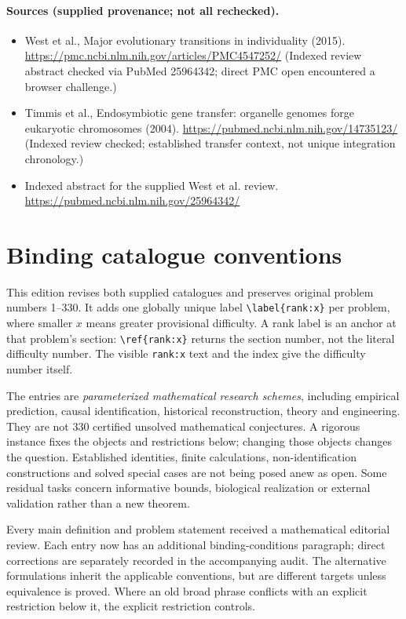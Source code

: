 \documentclass[11pt]{article}
\begin{document}
\paragraph{Sources (supplied provenance; not all rechecked).} \begin{itemize}
\item West et al., Major evolutionary transitions in individuality (2015). \url{https://pmc.ncbi.nlm.nih.gov/articles/PMC4547252/} (Indexed review abstract checked via PubMed 25964342; direct PMC open encountered a browser challenge.)
\item Timmis et al., Endosymbiotic gene transfer: organelle genomes forge eukaryotic chromosomes (2004). \url{https://pubmed.ncbi.nlm.nih.gov/14735123/} (Indexed review checked; established transfer context, not unique integration chronology.)
\item Indexed abstract for the supplied West et al. review. \url{https://pubmed.ncbi.nlm.nih.gov/25964342/}
\end{itemize}


\section*{Binding catalogue conventions}
This edition revises both supplied catalogues and preserves original problem numbers 1--330. It adds one globally unique label \verb|\label{rank:x}| per problem, where smaller $x$ means greater provisional difficulty. A rank label is an anchor at that problem's section: \verb|\ref{rank:x}| returns the section number, not the literal difficulty number. The visible \texttt{rank:x} text and the index give the difficulty number itself.

The entries are \emph{parameterized mathematical research schemes}, including empirical prediction, causal identification, historical reconstruction, theory and engineering. They are not 330 certified unsolved mathematical conjectures. A rigorous instance fixes the objects and restrictions below; changing those objects changes the question. Established identities, finite calculations, non-identification constructions and solved special cases are not being posed anew as open. Some residual tasks concern informative bounds, biological realization or external validation rather than a new theorem.

Every main definition and problem statement received a mathematical editorial review. Each entry now has an additional binding-conditions paragraph; direct corrections are separately recorded in the accompanying audit. The alternative formulations inherit the applicable conventions, but are different targets unless equivalence is proved. Where an old broad phrase conflicts with an explicit restriction below it, the explicit restriction controls.
\end{document}
